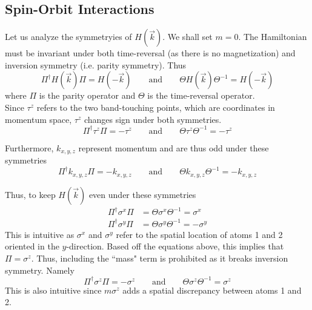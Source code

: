 \documentclass[12pt,a4paper,titlepage]{article}
\newcommand{\trm}[1]{\textrm{#1}} %
\begin{document}
\subsection{Spin-Orbit Interactions}
Let us analyze the symmetryies of $H(\vec{k})$. We shall set $m=0$. The Hamiltonian must be invariant under both time-reversal (as there is no magnetization) and inversion symmetry (i.e. parity symmetry). Thus
\begin{equation}
\Pi^{\dagger}H(\vec{k})\Pi=H(-\vec{k})\qquad\trm{and}\qquad\Theta H(\vec{k})\Theta^{-1}=H(-\vec{k})
\end{equation}
where $\Pi$ is the parity operator and $\Theta$ is the time-reversal operator.\\

Since $\tau^{z}$ refers to the two band-touching points, which are coordinates in momentum space, $\tau^{z}$ changes sign under both symmetries.
\begin{equation}
\Pi^{\dagger}\tau^{z}\Pi=-\tau^{z}\qquad\trm{and}\qquad\Theta\tau^{z}\Theta^{-1}=-\tau^{z}
\end{equation}

Furthermore, $k_{x,y,z}$ represent momentum and are thus odd under these symmetries
\begin{equation}
\Pi^{\dagger}k_{x,y,z}\Pi=-k_{x,y,z}\qquad\trm{and}\qquad\Theta k_{x,y,z}\Theta^{-1}=-k_{x,y,z}
\end{equation}

Thus, to keep $H(\vec{k})$ even under these symmetries
\begin{equation}
\begin{aligned}
\Pi^{\dagger}\sigma^{x}\Pi&=\Theta\sigma^{x}\Theta^{-1}=\sigma^{x}\\
\Pi^{\dagger}\sigma^{y}\Pi&=\Theta\sigma^{y}\Theta^{-1}=-\sigma^{y}
\end{aligned}
\end{equation}
This is intuitive as $\sigma^{x}$ and $\sigma^{y}$ refer to the spatial location of atoms 1 and 2 oriented in the $y$-direction. Based off the equations above, this implies that $\Pi=\sigma^{z}$. Thus, including the ``mass" term is prohibited as it breaks inversion symmetry. Namely
\begin{equation}
\Pi^{\dagger}\sigma^{z}\Pi=-\sigma^{z}\qquad\trm{and}\qquad\Theta\sigma^{z}\Theta^{-1}=\sigma^{z}
\end{equation}
This is also intuitive since $m\sigma^{z}$ adds a spatial discrepancy between atoms 1 and 2.\\
\end{document}
